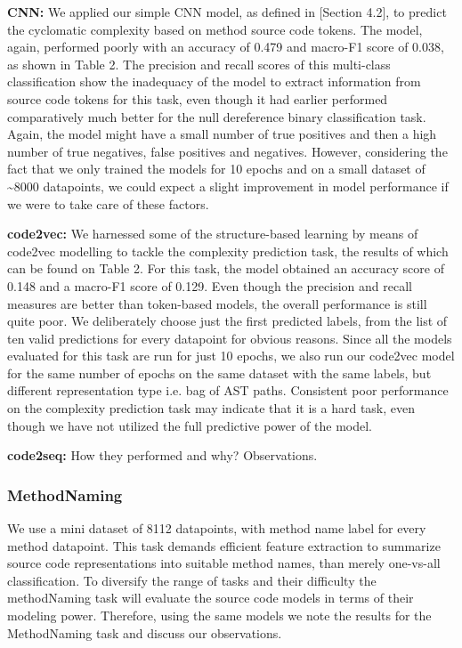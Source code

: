 \documentclass[sigplan,review,anonymous]{acmart}\settopmatter{printfolios=true,printccs=false,printacmref=false}
\begin{document}
\noindent
\textbf{CNN: } We applied our simple CNN model, as defined in [Section 4.2], to predict the cyclomatic complexity based on method source code tokens. The model, again, performed poorly with an accuracy of 0.479 and macro-F1 score of 0.038, as shown in Table 2. The precision and recall scores of this multi-class classification show the inadequacy of the model to extract information from source code tokens for this task, even though it had earlier performed comparatively much better for the null dereference binary classification task. Again, the model might have a small number of true positives and then a high number of true negatives, false positives and negatives. However, considering the fact that we only trained the models for 10 epochs and on a small dataset of \textasciitilde8000 datapoints, we could expect a slight improvement in model performance if we were to take care of these factors. \newline

\noindent
\textbf{code2vec: } We harnessed some of the structure-based learning by means of code2vec modelling to tackle the complexity prediction task, the results of which can be found on Table 2. For this task, the model obtained an accuracy score of 0.148 and a macro-F1 score of 0.129. Even though the precision and recall measures are better than token-based models, the overall performance is still quite poor. We deliberately choose just the first predicted labels, from the list of ten valid predictions for every datapoint for obvious reasons. Since all the models evaluated for this task are run for just 10 epochs, we also run our code2vec model for the same number of epochs on the same dataset with the same labels, but different representation type i.e. bag of AST paths. Consistent poor performance on the complexity prediction task may indicate that it is a hard task, even though we have not utilized the full predictive power of the model. \newline 

\noindent
\textbf{code2seq: } How they performed and why? Observations. 

\subsubsection{MethodNaming}
We use a mini dataset of 8112 datapoints, with method name label for every method datapoint. This task demands efficient feature extraction to summarize source code representations into suitable method names, than merely one-vs-all classification. To diversify the range of tasks and their difficulty the methodNaming task will evaluate the source code models in terms of their modeling power. Therefore, using the same models we note the results for the MethodNaming task and discuss our observations.   \newline
\end{document}
